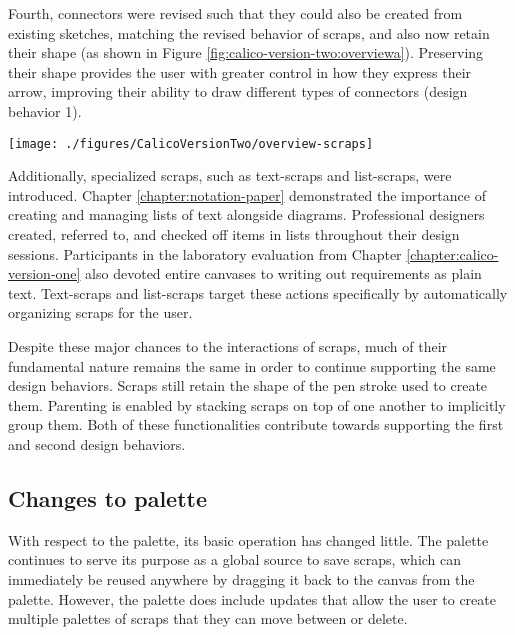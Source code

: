 Fourth, connectors were revised such that they could also be created from existing sketches, matching the revised behavior of scraps, and also now retain their shape (as shown in Figure \ref{fig:calico-version-two:overviewa}). Preserving their shape provides the user with greater control in how they express their arrow, improving their ability to draw different types of connectors (design behavior 1). 

\begin{figure*}[tbh]
  \centering
  \texttt{[image: ./figures/CalicoVersionTwo/overview-scraps]}
  \caption{Regular sketches can be transformed into selection scraps, which can further be made permanent by ``pinning'' the scrap.}
  \label{fig:calico-version-two:overviewa}
\end{figure*}

Additionally, specialized scraps, such as text-scraps and list-scraps, were introduced. Chapter \ref{chapter:notation-paper} demonstrated the importance of creating and managing lists of text alongside diagrams. Professional designers created, referred to, and checked off items in lists throughout their design sessions. Participants in the laboratory evaluation from Chapter \ref{chapter:calico-version-one} also devoted entire canvases to writing out requirements as plain text. Text-scraps and list-scraps target these actions specifically by automatically organizing scraps for the user.

Despite these major chances to the interactions of scraps, much of their fundamental nature remains the same in order to continue supporting the same design behaviors. Scraps still retain the shape of the pen stroke used to create them. Parenting is enabled by stacking scraps on top of one another to implicitly group them. Both of these functionalities contribute towards supporting the first and second design behaviors.

\subsection{Changes to palette}

With respect to the palette, its basic operation has changed little. The palette continues to serve its purpose as a global source to save scraps, which can immediately be reused anywhere by dragging it back to the canvas from the palette. However, the palette does include updates that allow the user to create multiple palettes of scraps that they can move between or delete. 

